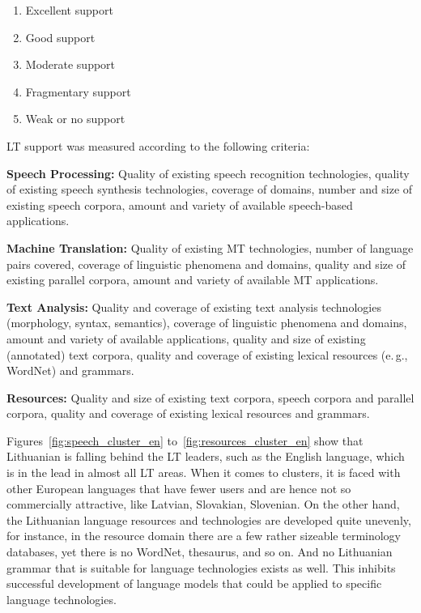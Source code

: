 \begin{multicols}{2}
\begin{enumerate}
\item Excellent support
\item Good support
\item Moderate support
\item Fragmentary support
\item Weak or no support
\end{enumerate}

LT support was measured according to the following criteria:

\textbf{Speech Processing:} Quality of existing speech recognition technologies, quality of existing speech synthesis technologies, coverage of domains, number and size of existing speech corpora, amount and variety of available speech-based applications.

\textbf{Machine Translation:} Quality of existing MT technologies, number of language pairs covered, coverage of linguistic phenomena and domains, quality and size of existing parallel corpora, amount and variety of available MT applications.

\textbf{Text Analysis:} Quality and coverage of existing text analysis technologies (morphology, syntax, semantics), coverage of linguistic phenomena and domains, amount and variety of available applications, quality and size of existing (annotated) text corpora, quality and coverage of existing lexical resources (e.\,g., WordNet) and grammars.

\textbf{Resources:} Quality and size of existing text corpora, speech corpora and parallel corpora, quality and coverage of existing lexical resources and grammars.

Figures~\ref{fig:speech_cluster_en} to~\ref{fig:resources_cluster_en} show that  Lithuanian is falling behind the LT leaders, such as the English language, which is in the lead in almost all LT areas. When it comes to clusters, it is faced with other European languages that have fewer users and are hence not so commercially attractive, like Latvian, Slovakian, Slovenian. On the other hand, the Lithuanian language resources and technologies are developed quite unevenly, for instance, in the resource domain there are a few rather sizeable terminology databases, yet there is no WordNet, thesaurus, and so on. And no Lithuanian grammar that is suitable for language technologies exists as well. This inhibits successful development of language models that could be applied to specific language technologies.


\end{multicols}
